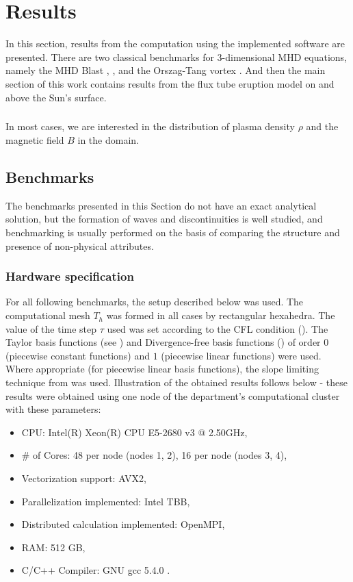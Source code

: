 \chapter{Results}
In this section, results from the computation using the implemented software are presented. There are two classical benchmarks for 3-dimensional MHD equations, namely the MHD Blast \cite{blast1}, \cite{blast2}, and the Orszag-Tang vortex \cite{vortex}. And then the main section of this work contains results from the flux tube eruption model on and above the Sun's surface.
\paragraph{}
In most cases, we are interested in the distribution of plasma density $\rho$ and the magnetic field $B$ in the domain.

\section{Benchmarks}

The benchmarks presented in this Section do not have an exact analytical solution, but the formation of waves and discontinuities is well studied, and benchmarking is usually performed on the basis of comparing the structure and presence of non-physical attributes.
\subsection{Hardware specification}
For all following benchmarks, the setup described below was used. The computational mesh $T_h$ was formed in all cases by rectangular hexahedra.
The value of the time step $\tau$ used was set according to the CFL condition ().
The Taylor basis functions (see \cite{KuzminVertex}) and Divergence-free basis functions () of order $0$ (piecewise constant functions) and $1$ (piecewise linear functions) were used.
Where appropriate (for piecewise linear basis functions), the slope limiting technique from  was used.
Illustration of the obtained results follows below - these results were obtained using one node of the department's computational cluster with these parameters:
\begin{itemize}
    \item CPU: Intel(R) Xeon(R) CPU E5-2680 v3 @ 2.50GHz,
    \item \# of Cores: 48 per node (nodes 1, 2), 16 per node (nodes 3, 4),
    \item Vectorization support: AVX2,
    \item Parallelization implemented: Intel TBB,
    \item Distributed calculation implemented: OpenMPI,
    \item RAM: 512 GB,
    \item C/C++ Compiler: GNU gcc 5.4.0 .
\end{itemize}

